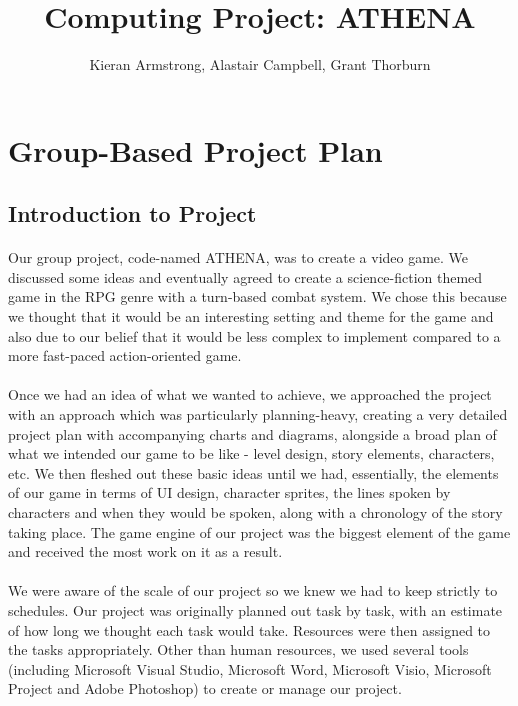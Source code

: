 \documentclass{article}
\title{Computing Project: ATHENA}
\author{Kieran Armstrong, Alastair Campbell, Grant Thorburn}
\begin{document}
\begin{titlepage}
\maketitle
\end{titlepage}

\section {Group-Based Project Plan}
\subsection{Introduction to Project}
\paragraph{}
Our group project, code-named ATHENA, was to create a video game. We discussed some ideas and eventually agreed to create a science-fiction themed game in the RPG genre with a turn-based combat system. We chose this because we thought that it would be an interesting setting and theme for the game and also due to our belief that it would be less complex to implement compared to a more fast-paced action-oriented game. 
\paragraph{}
Once we had an idea of what we wanted to achieve, we approached the project with an approach which was particularly planning-heavy, creating a very detailed project plan with accompanying charts and diagrams, alongside a broad plan of what we intended our game to be like - level design, story elements, characters, etc. We then fleshed out these basic ideas until we had, essentially, the elements of our game in terms of UI design, character sprites, the lines spoken by characters and when they would be spoken, along with a chronology of the story taking place. The game engine of our project was the biggest element of the game and received the most work on it as a result. 
\paragraph{}
We were aware of the scale of our project so we knew we had to keep strictly to schedules. Our project was originally planned out task by task, with an estimate of how long we thought each task would take. Resources were then assigned to the tasks appropriately. Other than human resources, we used several tools (including Microsoft Visual Studio, Microsoft Word, Microsoft Visio, Microsoft Project and Adobe Photoshop) to create or manage our project.
\end{document}
